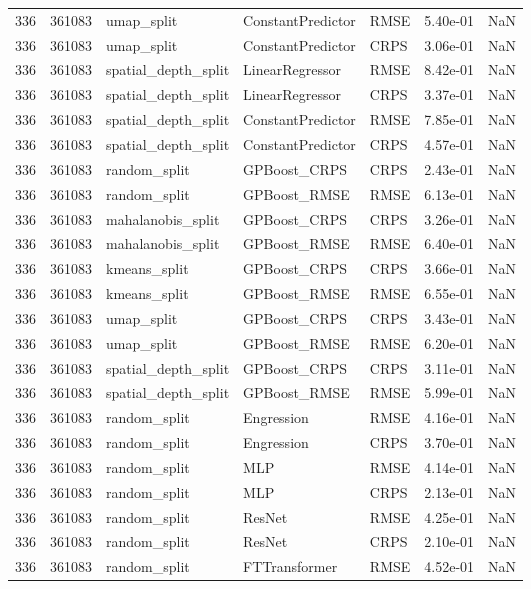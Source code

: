 \begin{tabular}{rrlllrr}
336 & 361083 & umap\_split & ConstantPredictor & RMSE & 5.40e-01 & NaN \\
336 & 361083 & umap\_split & ConstantPredictor & CRPS & 3.06e-01 & NaN \\
336 & 361083 & spatial\_depth\_split & LinearRegressor & RMSE & 8.42e-01 & NaN \\
336 & 361083 & spatial\_depth\_split & LinearRegressor & CRPS & 3.37e-01 & NaN \\
336 & 361083 & spatial\_depth\_split & ConstantPredictor & RMSE & 7.85e-01 & NaN \\
336 & 361083 & spatial\_depth\_split & ConstantPredictor & CRPS & 4.57e-01 & NaN \\
336 & 361083 & random\_split & GPBoost\_CRPS & CRPS & 2.43e-01 & NaN \\
336 & 361083 & random\_split & GPBoost\_RMSE & RMSE & 6.13e-01 & NaN \\
336 & 361083 & mahalanobis\_split & GPBoost\_CRPS & CRPS & 3.26e-01 & NaN \\
336 & 361083 & mahalanobis\_split & GPBoost\_RMSE & RMSE & 6.40e-01 & NaN \\
336 & 361083 & kmeans\_split & GPBoost\_CRPS & CRPS & 3.66e-01 & NaN \\
336 & 361083 & kmeans\_split & GPBoost\_RMSE & RMSE & 6.55e-01 & NaN \\
336 & 361083 & umap\_split & GPBoost\_CRPS & CRPS & 3.43e-01 & NaN \\
336 & 361083 & umap\_split & GPBoost\_RMSE & RMSE & 6.20e-01 & NaN \\
336 & 361083 & spatial\_depth\_split & GPBoost\_CRPS & CRPS & 3.11e-01 & NaN \\
336 & 361083 & spatial\_depth\_split & GPBoost\_RMSE & RMSE & 5.99e-01 & NaN \\
336 & 361083 & random\_split & Engression & RMSE & 4.16e-01 & NaN \\
336 & 361083 & random\_split & Engression & CRPS & 3.70e-01 & NaN \\
336 & 361083 & random\_split & MLP & RMSE & 4.14e-01 & NaN \\
336 & 361083 & random\_split & MLP & CRPS & 2.13e-01 & NaN \\
336 & 361083 & random\_split & ResNet & RMSE & 4.25e-01 & NaN \\
336 & 361083 & random\_split & ResNet & CRPS & 2.10e-01 & NaN \\
336 & 361083 & random\_split & FTTransformer & RMSE & 4.52e-01 & NaN \\

\end{tabular}

